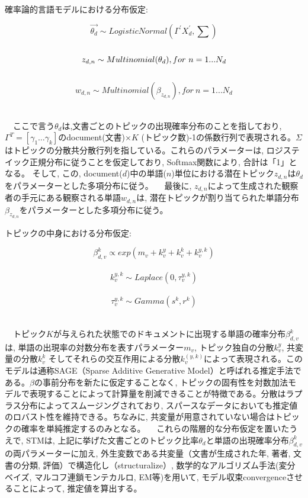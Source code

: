 \documentclass[
]{article}
\begin{document}
確率論的言語モデルにおける分布仮定:

\[  \vec{\theta_d}\sim LogisticNormal (\Gamma^\prime X_d^\prime,\sum)\]
　\newline \[z_{d,n}\sim  Multinomial(\theta_d), for \ n=1...N_d\\\]
　\newline
\[w_{d,n}\sim  Multinomial(\beta_{z_{d,n}}),  for \ n=1...N_d  \]
　\newline

　ここで言う\(θ_d\)は,文書ごとのトピックの出現確率分布のことを指しており,
\(Γ^T=[ γ_1… γ_k]\)のdocument(文書)×\(K\)
(トピック数)-1の係数行列で表現される。\(Σ\)はトピックの分散共分散行列を指している。これらのパラメーターは,
ロジステイック正規分布に従うことを仮定しており, Softmax関数により,
合計は「1」となる。 そして, この,
document(\(d\))中の単語(\(n\))単位における潜在トピック\(z_{d,n }\)は\(θ_d\)をパラメーターとした多項分布に従う。
　最後に,
\(z_{d,n}\)によって生成された観察者の手元にある観察される単語\(w_{d,n}\)は,
潜在トピックが割り当てられた単語分布\(β_{z_{d,n}}\)をパラメーターとした多項分布に従う。

トピックの中身における分布仮定:

\[β_{d,v}^k   ∝  exp (m_v+ k_v^y+ k_v^k  + k_v^{y,k})\] 　\newline
\[k_v^{y,k}   \sim Laplace(0,τ_v^{y,k} ) \] 　\newline
\[τ_v^{y,k}   \sim Gamma(s^k,r^k)   \] 　\newline

　トピック\(K\)が与えられた状態でのドキュメントに出現する単語の確率分布\(β_{d,v}^k\)は,
単語の出現率の対数分布を表すパラメーター\(m_v\),
トピック独自の分散\(k_v^y\), 共変量の分散\(k_v^k\)
そしてそれらの交互作用による分散\(k_v^(y,k)\)によって表現される。このモデルは通称SAGE（Sparse
Additive Generative
Model）と呼ばれる推定手法である。\(β\)の事前分布を新たに仮定することなく,
トピックの固有性を対数加法モデルで表現することによって計算量を削減できることが特徴である。分散はラプラス分布によってスムージングされており,
スパースなデータにおいても推定値のロバスト性を維持できる。ちなみに,
共変量が用意されていない場合はトピックの確率を単純推定するのみとなる。
　これらの階層的な分布仮定を置いたうえで, STMは,
上記に挙げた文書ごとのトピック比率\(θ_d\)と単語の出現確率分布\(β_{d,v}^k\)の両パラメーターに加え,
外生変数である共変量（文書が生成された年, 著者, 文書の分類,
評価）で構造化し（structuralize）, 数学的なアルゴリズム手法(変分ベイズ,
マルコフ連鎖モンテカルロ, EM等)を用いて,
モデル収束convergenceさせることによって, 推定値を算出する。
\end{document}
